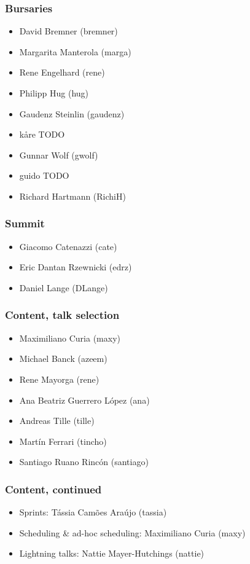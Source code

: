 \documentclass[t]{beamer}
\begin{document}
\begin{frame}
	\frametitle{Bursaries}
	\begin{itemize}
		\item David Bremner (bremner)
		\item Margarita Manterola (marga)
		\item Rene Engelhard (rene)
		\item Philipp Hug (hug)
		\item Gaudenz Steinlin (gaudenz)
		\item kåre TODO
		\item Gunnar Wolf (gwolf)
		\item guido TODO
		\item Richard Hartmann (RichiH)
	\end{itemize}
\end{frame}

\begin{frame}
	\frametitle{Summit}
	\begin{itemize}
		\item Giacomo Catenazzi (cate)
		\item Eric Dantan Rzewnicki (edrz)
		\item Daniel Lange (DLange)
	\end{itemize}
\end{frame}

\begin{frame}
	\frametitle{Content, talk selection}
	\begin{itemize}
		\item Maximiliano Curia (maxy)
		\item Michael Banck (azeem)
		\item Rene Mayorga (rene)
		\item Ana Beatriz Guerrero López (ana)
		\item Andreas Tille (tille)
		\item Martín Ferrari (tincho)
		\item Santiago Ruano Rincón (santiago)
	\end{itemize}
\end{frame}

\begin{frame}
	\frametitle{Content, continued}
	\begin{itemize}
		\item Sprints: Tássia Camões Araújo (tassia)
		\item Scheduling \& ad-hoc scheduling: Maximiliano Curia (maxy)
		\item Lightning talks: Nattie Mayer-Hutchings (nattie)
	\end{itemize}
\end{frame}
\end{document}
